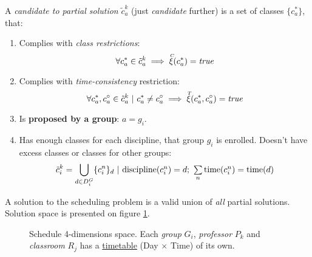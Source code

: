 \documentclass[../header]{subfiles}
\begin{document}
\medskip

\noindent
A \emph{candidate to partial solution} $\tilde{c}_a^k$ (just \emph{candidate} further)
is a set of classes $\{c_a^*\}$, that:
\begin{enumerate}
  \item Complies with \emph{class restrictions}: \\
    $$\forall c_a^* \in \tilde{c}_a^k \implies \accentset{C}{\xi}(c_a^*) = \mathit{true}$$
  \item Complies with \emph{time-consistency} restriction: \\
    $$\forall c_a^*, c_a^\circ \in \tilde{c}_a^k ~|~ c_a^* \not= c_a^\circ \implies
      \accentset{T}{\xi}(c_a^*, c_a^\circ) = \mathit{true}$$
  \item Is \textbf{proposed by a group}: $a = g_i$.
  \item Has enough classes for each discipline, that group $g_i$ is enrolled.
        Doesn't have excess classes or classes for other groups:
        $$\tilde{c}_i^k = \bigcup\limits_{d \in D^G_i}
                            \lbrace c_i^n \rbrace_d ~|~ \mathsmaller{
                                \mathrm{discipline}(c_i^n) = d;~
                                \sum\limits_n \mathrm{time}(c_i^n) =
                                              \mathrm{time}(d)   }$$

\end{enumerate}
\bigskip

\noindent
A solution to the scheduling problem is a valid union of \emph{all} partial solutions.
Solution space is presented on figure \ref{fig:ScheduleHypercube}.

\begin{figure}[H]
  \centering
  \resizebox{\textwidth}{!}{
    
  }
  \caption[Schedule 4-dimensions space]
          {Schedule 4-dimensions space. Each \emph{group} $G_i$,
          \emph{professor} $P_k$ and \emph{classroom} $R_j$ has a
          \underline{timetable} (Day $\times$ Time) of its own.}
  \label{fig:ScheduleHypercube}
\end{figure}
\end{document}

